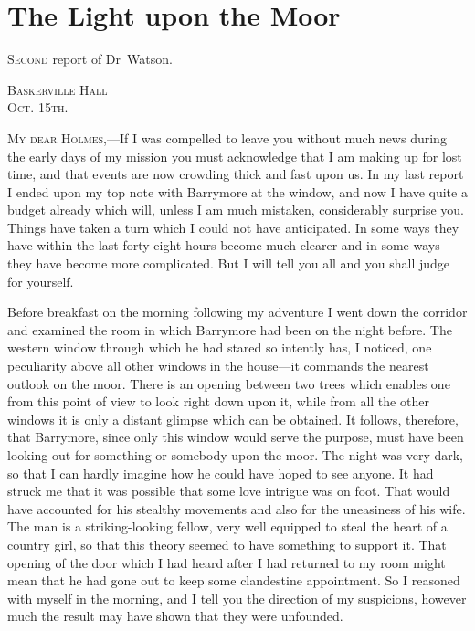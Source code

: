 \chapter{The Light upon the Moor}

\lettrine{S}{econd} report of Dr~Watson. \\
\begin{flushright}
\hfill\begin{minipage}{0.3\linewidth}\textsc{Baskerville Hall\\Oct. 15th.}\end{minipage}
\end{flushright}

\textsc{My dear Holmes},—If I was compelled to leave you without much news during the early days of my mission you must acknowledge that I am making up for lost time, and that events are now crowding thick and fast upon us. In my last report I ended upon my top note with Barrymore at the window, and now I have quite a budget already which will, unless I am much mistaken, considerably surprise you. Things have taken a turn which I could not have anticipated. In some ways they have within the last forty-eight hours become much clearer and in some ways they have become more complicated. But I will tell you all and you shall judge for yourself.

Before breakfast on the morning following my adventure I went down the corridor and examined the room in which Barrymore had been on the night before. The western window through which he had stared so intently has, I noticed, one peculiarity above all other windows in the house—it commands the nearest outlook on the moor. There is an opening between two trees which enables one from this point of view to look right down upon it, while from all the other windows it is only a distant glimpse which can be obtained. It follows, therefore, that Barrymore, since only this window would serve the purpose, must have been looking out for something or somebody upon the moor. The night was very dark, so that I can hardly imagine how he could have hoped to see anyone. It had struck me that it was possible that some love intrigue was on foot. That would have accounted for his stealthy movements and also for the uneasiness of his wife. The man is a striking-looking fellow, very well equipped to steal the heart of a country girl, so that this theory seemed to have something to support it. That opening of the door which I had heard after I had returned to my room might mean that he had gone out to keep some clandestine appointment. So I reasoned with myself in the morning, and I tell you the direction of my suspicions, however much the result may have shown that they were unfounded.

